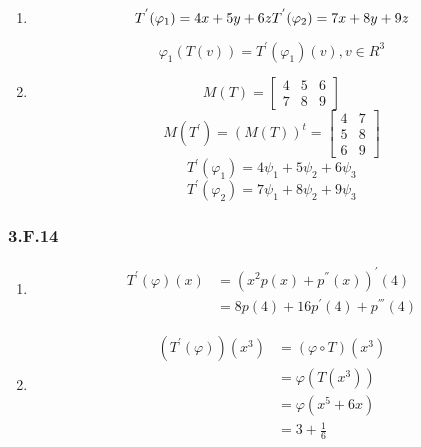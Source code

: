 \begin{enumerate}[label=(\alph*)]
\item 
\[
T^{'}(\varphi_{1}) = 4x + 5y + 6z \\
T^{'}(\varphi_{2}) = 7x + 8y + 9z
\]

\[ \varphi_{1}(T(v)) = T^{'}(\varphi_{1})(v), v\in R^{3} \]
\item

\begin{equation*}
M(T) = 
\begin{bmatrix}
4 & 5 & 6 \\
7 & 8 & 9
\end{bmatrix}
\end{equation*}
\begin{equation*}
M(T^{'}) = (M(T))^{t} = 
\begin{bmatrix}
4 & 7 \\
5 & 8 \\
6 & 9
\end{bmatrix}
\end{equation*}
\[
T^{'}(\varphi_{1}) = 4\psi_{1} + 5\psi_{2} + 6\psi_{3}
\]
\[
T^{'}(\varphi_{2}) = 7\psi_{1} + 8\psi_{2} + 9\psi_{3}
\]

\end{enumerate}

\subsubsection*{3.F.14}
\begin{enumerate}[label=(\alph*)]
\item 
\begin{equation*}
    \begin{split}
T^{'}(\varphi)(x) &= (x^{2}p(x) + p^{''}(x))^{'}(4) \\
&= 8p(4) + 16p^{'}(4) + p^{'''}(4)
\end{split}
\end{equation*}

\item
\begin{equation*}
    \begin{split}
(T^{'}(\varphi))(x^{3}) &= (\varphi \circ T)(x^{3}) \\
& = \varphi (T(x^{3})) \\
& = \varphi(x^{5} + 6x) \\
& = 3 + \frac{1}{6}
\end{split}
\end{equation*}
\end{enumerate}

